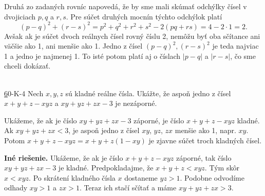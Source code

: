 \rie Druhá zo zadaných rovníc napovedá, že by sme mali skúmať odchýlky čísel v dvojiciach $p, q$ a $r, s$. Pre súčet druhých mocnín týchto odchýlok platí
$$(p - q)^2 + (r - s)^2=  p^2+ q^2+ r^2+ s^2 - 2(pq + rs) = 4 - 2 \cdot 1 = 2.$$
Avšak ak je súčet dvoch reálnych čísel rovný číslu 2, nemôžu byť oba sčítance ani väčšie ako 1, ani menšie ako 1. Jedno z čísel $(p - q)^2 , (r - s)^2$ je teda najviac 1 a jedno je najmenej 1. To isté potom platí aj o číslach $|p - q|$ a $|r - s|$, čo sme chceli dokázať.\\
\\
\begin{tcolorbox}[breakable,notitle,boxrule=0pt,colback=light-gray,colframe=light-gray]\ul
\end{tcolorbox}

\begin{tcolorbox}[breakable,notitle,boxrule=0pt,colback=light-gray,colframe=light-gray]\ul 60-K-4
Nech $x, y, z$ sú kladné reálne čísla. Ukážte, že aspoň jedno z čísel $x + y + z - xyz$ a
$xy + yz + zx - 3$ je nezáporné.

\end{tcolorbox}

\rie Ukážeme, že ak je číslo $xy + yz + zx - 3$ záporné, je číslo $x + y + z - xyz$ kladné.
Ak $xy + yz + zx < 3$, je aspoň jedno z čísel $xy$, $yz$, $zx$ menšie ako 1, napr. $xy$. Potom $x + y + z - xyz = x + y + z(1 - xy)$ je zjavne súčet troch kladných čísel.

\textbf{Iné riešenie.} Ukážeme, že ak je číslo $x+y +z -xyz$ záporné, tak číslo $xy +yz +zx-3$ je kladné.
Predpokladajme, že $x + y + z < xyz$. Tým skôr $x < xyz$. Po skrátení kladného čísla $x$ dostaneme $yz > 1$. Podobne odvodíme odhady $xy > 1$ a $zx > 1$. Teraz ich stačí sčítať a máme $xy + yz + zx > 3$.

